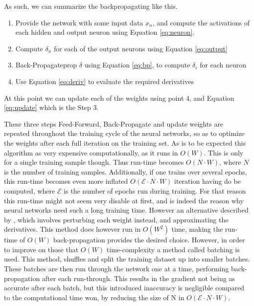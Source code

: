 As such, we can summarize the backpropagating like this.
\begin{enumerate}
    \item
        Provide the network with some input data $x_n$, and compute the
        activations of each hidden and output neuron using Equation
        \eqref{eq:neuron}.

    \item
        Compute $\delta_n$ for each of the output neurons using Equation
        \eqref{eq:output}
    \item
        Back-Propagateprop $\delta$ using Equation \eqref{eq:bp}, to compute
        $\delta_i$ for each neuron
    \item
        Use Equation \eqref{eq:deriv} to evaluate the required derivatives
\end{enumerate}

At this point we can update each of the weights using point 4, and
Equation \eqref{eq:update} which is the Step 3.

These three steps Feed-Forward, Back-Propagate and update weights are repeated
throughout the training cycle of the neural networks, so as to optimize the
weights after each full iteration on the training set. As is to be expected
this algorithm as very expensive computationally, as it runs in $O(W)$. This is
only for a single training sample though. Thus run-time becomes $O(N\cdot W)$,
where $N$ is the number of training samples. Additionally, if one trains over
several epochs, this run-time becomes even more inflated $O(\mathcal{E}\cdot
N\cdot W)$ iteration having do be computed, where $\mathcal{E}$ is the number
of epochs run during training. For that reason this run-time might not seem
very disable at first, and is indeed the reason why neural networks need such
a long training time. However an alternative described by \cite{Bishop}, which
involves perturbing each weight instead, and approximating the derivatives. This
method does however run in $O(W^2)$ time, making the run-time of $O(W)$ 
back-propagation provides the desired choice. However, in order to improve on
those that $O(W)$ time-complexity a method called batching is used. This method,
shuffles and split the training dataset up into smaller batches. These batches
are then run through the network one at a time, performing back-propagation
after each run-through. This results in the gradient not being as accurate
after each batch, but this introduced inaccuracy is negligible compared to the
computational time won, by reducing the size of N in $O(\mathcal{E}\cdot N\cdot
W)$.\cite{Bishop}



